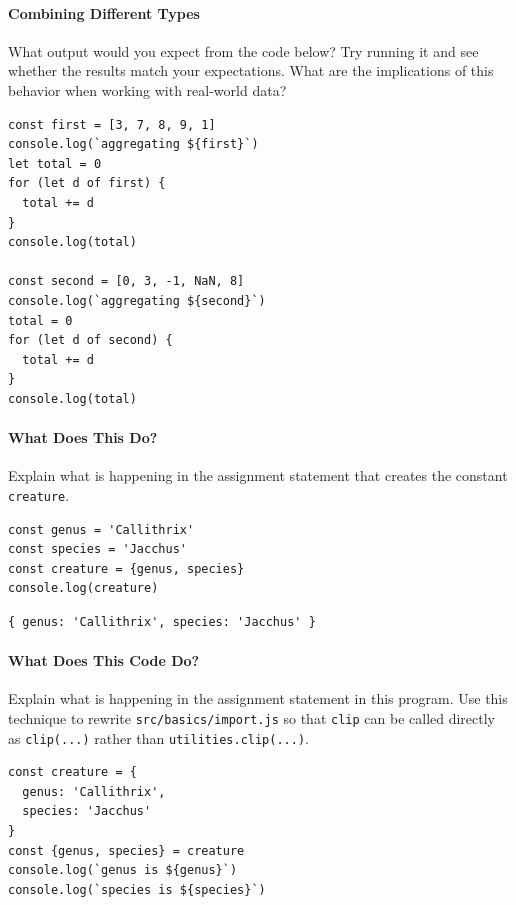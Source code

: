 \paragraph{Combining Different Types}\label{combining-different-types}

What output would you expect from the code below? Try running it and see
whether the results match your expectations. What are the implications
of this behavior when working with real-world data?

\begin{verbatim}
const first = [3, 7, 8, 9, 1]
console.log(`aggregating ${first}`)
let total = 0
for (let d of first) {
  total += d
}
console.log(total)

const second = [0, 3, -1, NaN, 8]
console.log(`aggregating ${second}`)
total = 0
for (let d of second) {
  total += d
}
console.log(total)
\end{verbatim}

\paragraph{What Does This Do?}\label{what-does-this-do}

Explain what is happening in the assignment statement that creates the
constant \texttt{creature}.

\begin{verbatim}
const genus = 'Callithrix'
const species = 'Jacchus'
const creature = {genus, species}
console.log(creature)
\end{verbatim}

\begin{verbatim}
{ genus: 'Callithrix', species: 'Jacchus' }
\end{verbatim}

\paragraph{What Does This Code Do?}\label{what-does-this-code-do}

Explain what is happening in the assignment statement in this program.
Use this technique to rewrite \texttt{src/basics/import.js} so that
\texttt{clip} can be called directly as \texttt{clip(...)} rather than
\texttt{utilities.clip(...)}.

\begin{verbatim}
const creature = {
  genus: 'Callithrix',
  species: 'Jacchus'
}
const {genus, species} = creature
console.log(`genus is ${genus}`)
console.log(`species is ${species}`)
\end{verbatim}

